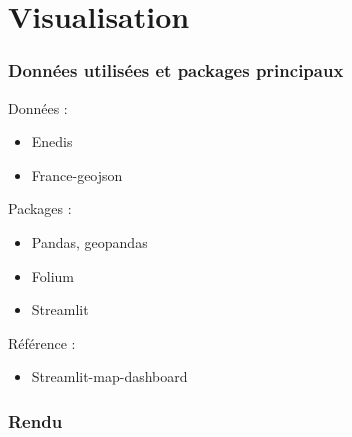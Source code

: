 
\section{Visualisation}

\begin{frame}
\frametitle{Données utilisées et packages principaux}

Données :
\begin{itemize}
\item Enedis
\item France-geojson
\end{itemize}

\vspace{0.5cm}

Packages :
\begin{itemize}
\item Pandas, geopandas 
\item Folium
\item Streamlit
\end{itemize}

\vspace{0.5cm}

Référence :
\begin{itemize}
\item Streamlit-map-dashboard
\end{itemize}

\end{frame}


\begin{frame}
\frametitle{Rendu}

\vspace{-0.5cm}

\begin{center}
\end{center}

\end{frame}
